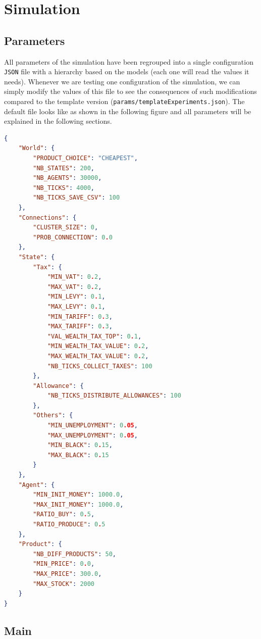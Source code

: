 \chapter{Simulation}

\section{Parameters}

All parameters of the simulation have been regrouped into a single configuration \texttt{JSON} file with a hierarchy based on the models (each one will read the values it needs). Whenever we are testing one configuration of the simulation, we can simply modify the values of this file to see the consequences of such modifications compared to the template version (\texttt{params/templateExperiments.json}). The default file looks like as shown in the following figure and all parameters will be explained in the following sections.

\begin{lstlisting}[language=json,firstnumber=1]
{
    "World": {
        "PRODUCT_CHOICE": "CHEAPEST",
        "NB_STATES": 200,
        "NB_AGENTS": 30000,
        "NB_TICKS": 4000,
        "NB_TICKS_SAVE_CSV": 100
    },
    "Connections": {
        "CLUSTER_SIZE": 0,
        "PROB_CONNECTION": 0.0
    },
    "State": {
        "Tax": {
            "MIN_VAT": 0.2,
            "MAX_VAT": 0.2,
            "MIN_LEVY": 0.1,
            "MAX_LEVY": 0.1,
            "MIN_TARIFF": 0.3,
            "MAX_TARIFF": 0.3,
            "VAL_WEALTH_TAX_TOP": 0.1,
            "MIN_WEALTH_TAX_VALUE": 0.2,
            "MAX_WEALTH_TAX_VALUE": 0.2,
            "NB_TICKS_COLLECT_TAXES": 100
        },
        "Allowance": {
            "NB_TICKS_DISTRIBUTE_ALLOWANCES": 100
        },
        "Others": {
            "MIN_UNEMPLOYMENT": 0.05,
            "MAX_UNEMPLOYMENT": 0.05,
            "MIN_BLACK": 0.15,
            "MAX_BLACK": 0.15
        }
    },
    "Agent": {
        "MIN_INIT_MONEY": 1000.0,
        "MAX_INIT_MONEY": 1000.0,
        "RATIO_BUY": 0.5,
        "RATIO_PRODUCE": 0.5
    },
    "Product": {
        "NB_DIFF_PRODUCTS": 50,
        "MIN_PRICE": 0.0,
        "MAX_PRICE": 300.0,
        "MAX_STOCK": 2000
    }
}
\end{lstlisting}

\section{Main}

